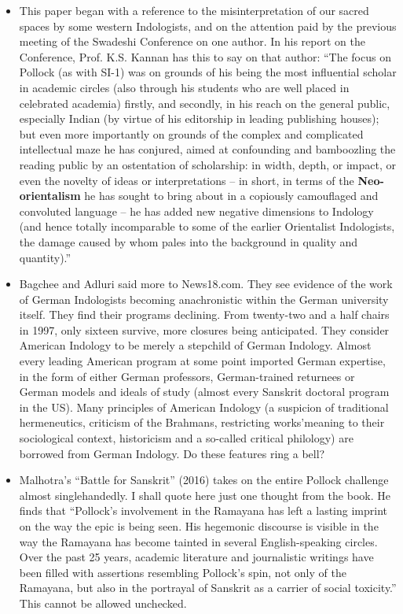 \begin{itemize}
\item This paper began with a reference to the misinterpretation of our sacred spaces by some western Indologists, and on the attention paid by the previous meeting of the Swadeshi Conference on one author. In his report on the Conference, Prof. K.S. Kannan has this to say on that author: “The focus on Pollock (as with SI-1) was on grounds of his being the most influential scholar in academic circles (also through his students who are well placed in celebrated academia) firstly, and secondly, in his reach on the general public, especially Indian (by virtue of his editorship in leading publishing houses); but even more importantly on grounds of the complex and complicated intellectual maze he has conjured, aimed at confounding and bamboozling the reading public by an ostentation of scholarship: in width, depth, or impact, or even the novelty of ideas or interpretations – in short, in terms of the \textbf{Neo-orientalism} he has sought to bring about in a copiously camouflaged and convoluted language – he has added new negative dimensions to Indology (and hence totally incomparable to some of the earlier Orientalist Indologists, the damage caused by whom pales into the background in quality and quantity).”

 \item Bagchee and Adluri said more to News18.com. They see evidence of the work of German Indologists becoming anachronistic within the German university itself. They find their programs declining. From twenty-two and a half chairs in 1997, only sixteen survive, more closures being anticipated. They consider American Indology to be merely a stepchild of German Indology. Almost every leading American program at some point imported German expertise, in the form of either German professors, German-trained returnees or German models and ideals of study (almost every Sanskrit doctoral program in the US). Many principles of American Indology (a suspicion of traditional hermeneutics, criticism of the Brahmans, restricting works’\break meaning to their sociological context, historicism and a so-called critical philology) are borrowed from German Indology. Do these features ring a bell?

 \item Malhotra’s “Battle for Sanskrit” (2016) takes on the entire Pollock challenge almost singlehandedly. I shall quote here just one thought from the book. He finds that “Pollock’s involvement in the Ramayana has left a lasting imprint on the way the epic is being seen. His hegemonic discourse is visible in the way the Ramayana has become tainted in several English-speaking circles. Over the past 25 years, academic literature and journalistic writings have been filled with assertions resembling Pollock’s spin, not only of the Ramayana, but also in the portrayal of Sanskrit as a carrier of social toxicity.” This cannot be allowed unchecked.


\end{itemize}
